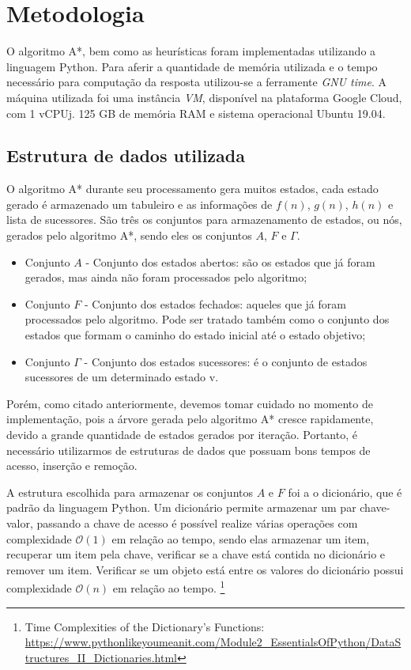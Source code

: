 \documentclass[12pt]{article}
\begin{document}
\section{Metodologia}

O algoritmo A*, bem como as heurísticas foram implementadas utilizando a linguagem Python. Para aferir a quantidade de memória utilizada e o tempo necessário para computação da resposta utilizou-se a ferramente \textit{GNU time}. A máquina utilizada foi uma instância \textit{VM}, disponível na plataforma Google Cloud, com 1 vCPUj. 125 GB de memória RAM e sistema operacional Ubuntu 19.04.

\subsection{Estrutura de dados utilizada}

O algoritmo A* durante seu processamento gera muitos estados, cada estado gerado é armazenado um tabuleiro e as informações de $f(n)$, $g(n)$, $h(n)$ e lista de sucessores. São três os conjuntos para armazenamento de estados, ou nós, gerados pelo algoritmo A*, sendo eles os conjuntos $A$, $F$ e $\Gamma$.
\begin{itemize}
    \item Conjunto $A$ - Conjunto dos estados abertos: são os estados que já foram gerados, mas ainda não foram processados pelo algoritmo;
    \item Conjunto $F$ - Conjunto dos estados fechados: aqueles que já foram processados pelo algoritmo. Pode ser tratado também como o conjunto dos estados que formam o caminho do estado inicial até o estado objetivo;
    \item Conjunto $\Gamma$ - Conjunto dos estados sucessores: é o conjunto de estados sucessores de um determinado estado v.
\end{itemize}

Porém, como citado anteriormente, devemos tomar cuidado no momento de implementação, pois a árvore gerada pelo algoritmo A* cresce rapidamente, devido a grande quantidade de estados gerados por iteração. Portanto, é necessário utilizarmos de estruturas de dados que possuam bons tempos de acesso, inserção e remoção.

A estrutura escolhida para armazenar os conjuntos $A$ e $F$ foi a o dicionário, que é padrão da linguagem Python. Um dicionário permite armazenar um par chave-valor, passando a chave de acesso é possível realize várias operações com complexidade $\mathcal{O}(1)$ em relação ao tempo, sendo elas armazenar um item, recuperar um item pela chave, verificar se a chave está contida no dicionário e remover um item. Verificar se um objeto está entre os valores do dicionário possui complexidade $\mathcal{O}(n)$ em relação ao tempo. \footnote{Time Complexities of the Dictionary’s Functions: \url{https://www.pythonlikeyoumeanit.com/Module2_EssentialsOfPython/DataStructures_II_Dictionaries.html}} 
\end{document}
